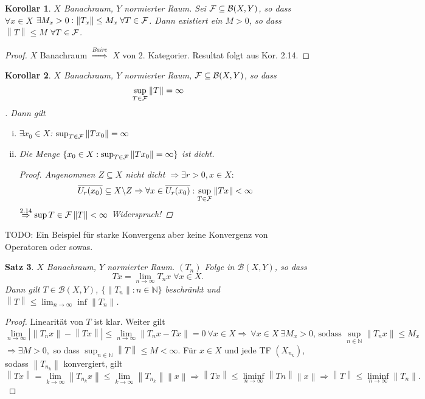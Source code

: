 \documentclass[ngerman]{report}
\theoremstyle{plain}%
\newtheorem{thm}{Satz}[chapter]
\newtheorem{cor}[thm]{Korollar}
\theoremstyle{definition}%
\theoremstyle{myStyle}
\newcommand{\N}{\mathbb{N}}
\newcommand{\BS}[1][X,Y]{\mathcal{B}(#1)} %
\newcommand{\norm}[1]{\left \|#1\right\| }
\newcommand{\df}[1][]{%
	\overset{#1}{\Rightarrow}
}
\newcommand{\U}[2][1]{U_{#1}(#2)} %
\newcommand{\limes}[1][\infty]{\lim_{n \to #1}}
\newcommand{\disp}{\displaystyle}
\begin{document}
	\begin{cor}
		$X$ Banachraum, $Y$ normierter Raum. Sei $\F \subseteq \BS$, so dass $\forall x \in X$ $\exists M_x > 0: \norm{T_x} \leq M_x \; \forall T\in \F$. Dann existiert ein $M > 0$, so dass $\norm{T} \leq M$ $\forall T \in \mathcal{F}$.
	\end{cor}

	\begin{proof}
		$X$ Banachraum $\df[Baire]$ $X$ von 2. Kategorier. Resultat folgt aus Kor. 2.14.
	\end{proof}

	\begin{cor}
		$X$ Banachraum, $Y$ normierter Raum, $\F \subseteq \BS$, so dass 
			$$ \sup_{T\in\F} \norm{T} = \infty \vspace{-1em} $$. 
		Dann gilt 
			\begin{enumerate}[(i)]
				\item $\exists x_0 \in X$: $\sup_{T\in \F} \norm{Tx_0} = \infty$
				\item Die Menge $\{x_0 \in X: \sup_{T\in \F} \norm{Tx_0} = \infty\}$ ist dicht.
					\begin{proof}
						Angenommen $Z \subseteq X$ nicht dicht $ \df \exists r>0, x\in X: $
							$$ \overline{\U[r]{x_0}} \subseteq X \backslash Z \df \forall x \in \overline{\U[r]{x_0}} : \sup_{T\in\F} \norm{Tx} < \infty$$
							$\df[2.14] \sup{T\in \F} \norm{T} < \infty$ Widerspruch!
					\end{proof}
			\end{enumerate}
	\end{cor}

TODO: Ein Beispiel für starke Konvergenz aber keine Konvergenz von Operatoren oder sowas.

	\begin{thm}
		$X$ Banachraum, $Y$ normierter Raum. $(T_n)$ Folge in $\BS$, so dass 
			$$ Tx = \limes T_n x \; \forall x\in X.$$ 
		Dann gilt $T\in \BS$, $\{\norm{T_n} : n\in \N\}$ beschränkt und $\norm{T} \leq \limes\inf \norm{T_n}$.
	\end{thm}

	\begin{proof}
		Linearität von $T$ ist klar. Weiter gilt 
			$$ \limes |\norm{T_nx}-\norm{Tx}| \leq \limes \norm{T_nx-Tx} = 0 ~\forall x \in X \df ~\forall x \in X ~\exists M_x>0 \text{, sodass } \sup_{n \in \N} \norm{T_nx}\leq M_x$$ 
		$\df \exists M>0,$ so dass $ \disp \sup_{n \in \N} \norm{T}\leq M<\infty$. 
		Für $x \in X$ und jede TF $(X_{n_k})$, sodass $\norm{T_{n_k}}$ konvergiert, gilt
			$$ \norm{Tx}=\lim_{k \to \infty}\norm{T_{n_k}x}\leq \lim_{k \to \infty}\norm{T_{n_k}}\norm{x} \df \norm{Tx} \leq \liminf_{n \to \infty} \norm{Tn}\norm{x} \df \norm{T} \leq \liminf_{n \to \infty} \norm{T_n}.$$ 
	\end{proof}
\end{document}
